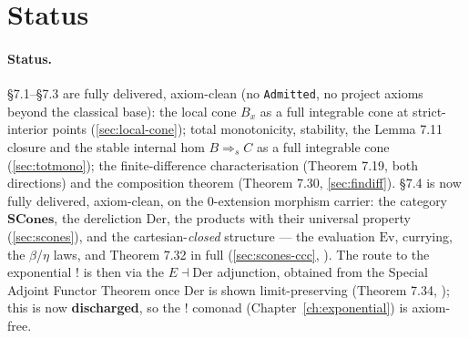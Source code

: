 \section{Status}\label{sec:stable-status}

\paragraph{Status.}
\S7.1--\S7.3 are fully delivered, axiom-clean (no \texttt{Admitted}, no
project axioms beyond the classical base): the local cone $B_x$ as a
full integrable cone at strict-interior points (\autoref{sec:local-cone});
total monotonicity, stability, the Lemma 7.11 closure and the stable
internal hom $B \mathbin{\Rightarrow_s} C$ as a full integrable cone
(\autoref{sec:totmono}); the finite-difference characterisation
(Theorem 7.19, both directions) and the composition theorem
(Theorem 7.30, \autoref{sec:findiff}). \S7.4 is now fully delivered,
axiom-clean, on the $0$-extension morphism carrier: the category
$\mathbf{SCones}$, the dereliction $\mathrm{Der}$, the products with
their universal property (\autoref{sec:scones}), and the
cartesian-\emph{closed} structure --- the evaluation $\mathrm{Ev}$,
currying, the $\beta$/$\eta$ laws, and Theorem 7.32 in full
(\autoref{sec:scones-ccc}, ).
The route to the exponential $\mathord{!}$ is then via the $E \dashv
\mathrm{Der}$ adjunction, obtained from the Special Adjoint Functor
Theorem once $\mathrm{Der}$ is shown limit-preserving (Theorem 7.34,
); this is now
\textbf{discharged}, so the $\mathord{!}$ comonad
(Chapter~\ref{ch:exponential}) is axiom-free.
